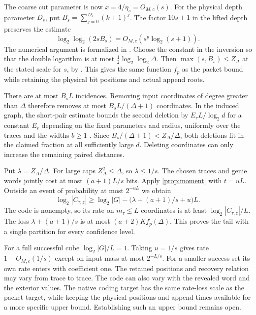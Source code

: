 \begin{outline}
The coarse cut parameter is now $x=4/\eta_s=O_{M,c}(s)$. For the
physical depth parameter $D_s$, put
$B_s=\sum_{j=0}^{D_s}(k+1)^j$. The factor $10s+1$ in the lifted depth
preserves the estimate
\[
 \log_2\log_2(2sB_s)=O_{M,c}(s^p\log_2(s+1)).
\]
The numerical argument is formalized in
. Choose the
constant in the inversion so that the double logarithm is at most
$\tfrac12\log_2\log_2\Delta$. Then $\max(s,B_s)\le Z_\Delta$ at the
stated scale for $s$, by
. This gives the same
function $f_p$ as the packet bound while retaining the physical bit
positions and actual append roots.

There are at most $B_sL$ incidences. Removing input coordinates of degree
greater than $\Delta$ therefore removes at most $B_sL/(\Delta+1)$
coordinates. In the induced graph, the short-pair estimate bounds the
second deletion by $E_r L/\log_2 d$ for a constant $E_r$ depending on the
fixed parameters and radius, uniformly over the traces and the widths
$b\ge1$ \cite[Proposition~4.11(a), accompanying Lean theorem]{PaperEleven}.
Since $B_s/(\Delta+1)<Z_\Delta/\Delta$, both deletions fit in the
claimed fraction at all sufficiently large $d$. Deleting coordinates
can only increase the remaining paired distances.

Put $\lambda=Z_\Delta/\Delta$. For large caps $Z_\Delta^2\le\Delta$,
so $\lambda\le1/s$. The chosen traces and genie words jointly cost at
most $(a+1)L/s$ bits. Apply \cref{prop:moment} with $t=uL$. Outside
an event of probability at most $2^{-uL}$ we obtain
\[
 \log_2 |C_{\tau,z}|
 \ge\log_2|G|-\bigl(\lambda+(a+1)/s+u\bigr)L .
\]
The code is nonempty, so its rate on $m_\tau\le L$ coordinates is at
least $\log_2|C_{\tau,z}|/L$. The loss
$\lambda+(a+1)/s$ is at most $(a+2)K f_p(\Delta)$. This proves the
tail with a single partition for every confidence level.
\end{outline}

For a full successful cube $\log_2|G|/L=1$. Taking $u=1/s$ gives rate
$1-O_{M,c}(1/s)$ except on input mass at most $2^{-L/s}$. For a smaller
success set its own rate enters with coefficient one. The retained
positions and recovery relation may vary from trace to trace. The code can also vary with the revealed word and the exterior values.
The native coding target has the same rate-loss scale as the packet
target, while keeping the physical positions and append times available
for a more specific upper bound. Establishing such an upper bound remains open.

